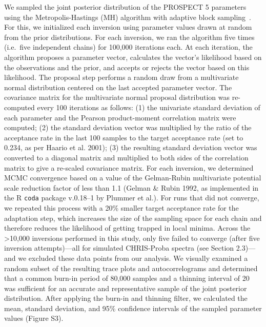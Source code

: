 We sampled the joint posterior distribution of the PROSPECT 5 parameters using the Metropolis-Hastings (MH) algorithm with adaptive block sampling~\cite{haario_2001_adaptive}.
For this, we initialized each inversion using parameter values drawn at random from the prior distributions.
For each inversion, we ran the algorithm five times (i.e.\ five independent chains) for 100,000 iterations each.
At each iteration, the algorithm proposes a parameter vector, calculates the vector’s likelihood based on the observations and the prior, and accepts or rejects the vector based on this likelihood.
The proposal step performs a random draw from a multivariate normal distribution centered on the last accepted parameter vector.
The covariance matrix for the multivariate normal proposal distribution was re-computed every 100 iterations as follows:
(1) the univariate standard deviation of each parameter and the Pearson product-moment correlation matrix were computed;
(2) the standard deviation vector was multiplied by the ratio of the acceptance rate in the last 100 samples to the target acceptance rate (set to 0.234, as per Haario et al. 2001);
(3) the resulting standard deviation vector was converted to a diagonal matrix and multiplied to both sides of the correlation matrix to give a re-scaled covariance matrix. 
For each inversion, we determined MCMC convergence based on a value of the Gelman-Rubin multivariate potential scale reduction factor of less than 1.1 (Gelman \& Rubin 1992, as implemented in the R \texttt{coda} package v.0.18--1 by Plummer et al.). \nocite{gelman_1992_inference,r_coda}
For runs that did not converge, we repeated this process with a 20\% smaller target acceptance rate for the adaptation step, which increases the size of the sampling space for each chain and therefore reduces the likelihood of getting trapped in local minima. 
Across the >10,000 inversions performed in this study, only five failed to converge (after five inversion attempts)—all for simulated CHRIS-Proba spectra (see Section 2.3)—and we excluded these data points from our analysis. %
We visually examined a random subset of the resulting trace plots and autocorrelograms and determined that a common burn-in period of 80,000 samples and a thinning interval of 20 was sufficient for an accurate and representative sample of the joint posterior distribution.
After applying the burn-in and thinning filter, we calculated the mean, standard deviation, and 95\% confidence intervals of the sampled parameter values (Figure S3). %

